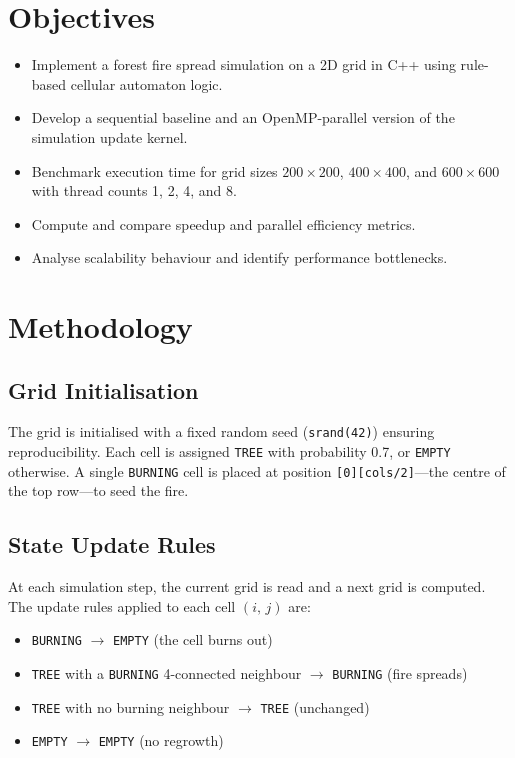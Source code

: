 \documentclass[12pt,a4paper]{article}
\begin{document}
\section{Objectives}

\begin{itemize}
    \item Implement a forest fire spread simulation on a 2D grid in C++ using
          rule-based cellular automaton logic.
    \item Develop a sequential baseline and an OpenMP-parallel version of the
          simulation update kernel.
    \item Benchmark execution time for grid sizes $200\times200$, $400\times400$,
          and $600\times600$ with thread counts 1, 2, 4, and 8.
    \item Compute and compare speedup and parallel efficiency metrics.
    \item Analyse scalability behaviour and identify performance bottlenecks.
\end{itemize}

\section{Methodology}

\subsection{Grid Initialisation}

The grid is initialised with a fixed random seed (\texttt{srand(42)}) ensuring
reproducibility. Each cell is assigned \texttt{TREE} with probability 0.7, or
\texttt{EMPTY} otherwise. A single \texttt{BURNING} cell is placed at position
\texttt{[0][cols/2]}---the centre of the top row---to seed the fire.

\subsection{State Update Rules}

At each simulation step, the current grid is read and a next grid is computed. The
update rules applied to each cell $(i,\,j)$ are:

\begin{itemize}
    \item \texttt{BURNING} $\rightarrow$ \texttt{EMPTY} (the cell burns out)
    \item \texttt{TREE} with a \texttt{BURNING} 4-connected neighbour
          $\rightarrow$ \texttt{BURNING} (fire spreads)
    \item \texttt{TREE} with no burning neighbour $\rightarrow$ \texttt{TREE}
          (unchanged)
    \item \texttt{EMPTY} $\rightarrow$ \texttt{EMPTY} (no regrowth)
\end{itemize}
\end{document}
